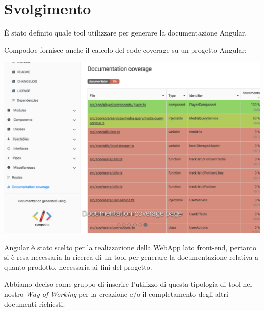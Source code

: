 \section{Svolgimento}

È stato definito quale tool utilizzare per generare la documentazione Angular.

Compodoc fornisce anche il calcolo del code coverage su un progetto Angular:

\includegraphics[width = 0.9\linewidth]{img/compodoc.png}

Angular è stato scelto per la realizzazione della WebApp lato front-end, pertanto si è resa necessaria la ricerca di un tool per generare la documentazione relativa a quanto prodotto, necessaria ai fini del progetto.

Abbiamo deciso come gruppo di inserire l'utilizzo di questa tipologia di tool nel nostro {\it{Way of Working}} per la creazione e/o il completamento degli altri documenti richiesti.